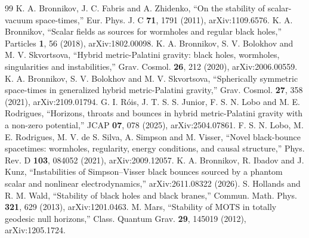 \documentclass[11pt]{article}
\theoremstyle{plain}
\begin{document}
\begin{thebibliography}{99}
 K. A. Bronnikov, J. C. Fabris and A. Zhidenko, ``On the stability of scalar-vacuum space-times,'' Eur. Phys.
J. C \textbf{71}, 1791 (2011), arXiv:1109.6576.
 K. A. Bronnikov, ``Scalar fields as sources for wormholes and regular black holes,'' Particles \textbf{1}, 56
(2018), arXiv:1802.00098.
 K. A. Bronnikov, S. V. Bolokhov and M. V. Skvortsova, ``Hybrid metric-Palatini gravity: black holes,
wormholes, singularities and instabilities,'' Grav. Cosmol. \textbf{26}, 212 (2020), arXiv:2006.00559.
 K. A. Bronnikov, S. V. Bolokhov and M. V. Skvortsova, ``Spherically symmetric space-times in generalized
hybrid metric-Palatini gravity,'' Grav. Cosmol. \textbf{27}, 358 (2021), arXiv:2109.01794.
 G. I. Róis, J. T. S. S. Junior, F. S. N. Lobo and M. E. Rodrigues, ``Horizons, throats and bounces in hybrid metric-Palatini gravity with a
non-zero potential,'' JCAP \textbf{07}, 078 (2025), arXiv:2504.07861.
 F. S. N. Lobo, M. E. Rodrigues, M. V. de S. Silva, A. Simpson and M. Visser, ``Novel black-bounce
spacetimes: wormholes, regularity, energy conditions, and causal structure,'' Phys. Rev. D \textbf{103}, 084052 (2021),
arXiv:2009.12057.
 K. A. Bronnikov, R. Ibadov and J. Kunz, ``Instabilities of Simpson--Visser black bounces sourced by a phantom
scalar and nonlinear electrodynamics,'' arXiv:2611.08322 (2026).
 S. Hollands and R. M. Wald, ``Stability of black holes and black branes,'' Commun. Math. Phys. \textbf{321},
629 (2013), arXiv:1201.0463.
 M. Mars, ``Stability of MOTS in totally geodesic null horizons,'' Class. Quantum Grav. \textbf{29}, 145019
(2012), arXiv:1205.1724.
\end{thebibliography}
\end{document}
